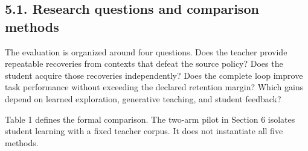 \documentclass[
  american,
  11pt,
  a4paper,
]{article}
\begin{document}
\subsection{5.1. Research questions and comparison
methods}\label{research-questions-and-comparison-methods}

The evaluation is organized around four questions. Does the teacher
provide repeatable recoveries from contexts that defeat the source
policy? Does the student acquire those recoveries independently? Does
the complete loop improve task performance without exceeding the
declared retention margin? Which gains depend on learned exploration,
generative teaching, and student feedback?

Table 1 defines the formal comparison. The two-arm pilot in Section 6
isolates student learning with a fixed teacher corpus. It does not
instantiate all five methods.
\end{document}
